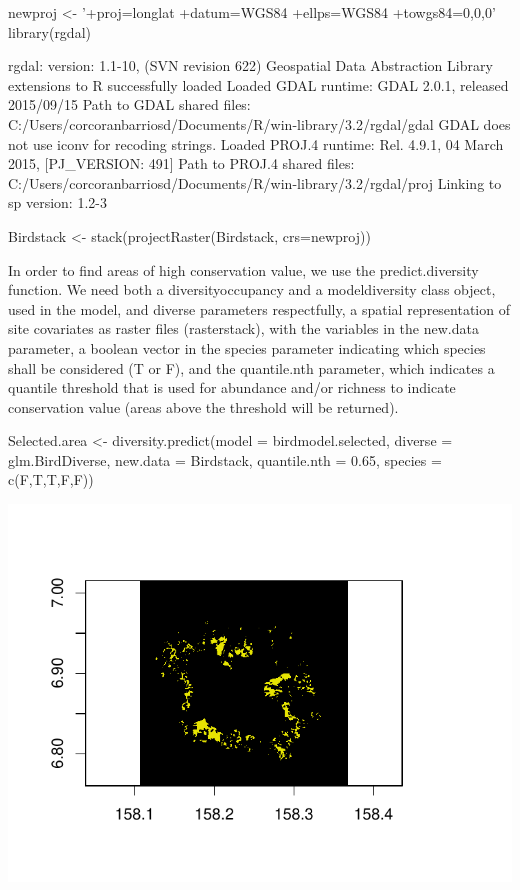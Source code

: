 \documentclass[article]{jss}
\begin{document}
\begin{CodeChunk}
\begin{CodeInput}
newproj <- '+proj=longlat +datum=WGS84 +ellps=WGS84 +towgs84=0,0,0'
library(rgdal)
\end{CodeInput}
\begin{CodeOutput}
rgdal: version: 1.1-10, (SVN revision 622)
 Geospatial Data Abstraction Library extensions to R successfully loaded
 Loaded GDAL runtime: GDAL 2.0.1, released 2015/09/15
 Path to GDAL shared files: C:/Users/corcoranbarriosd/Documents/R/win-library/3.2/rgdal/gdal
 GDAL does not use iconv for recoding strings.
 Loaded PROJ.4 runtime: Rel. 4.9.1, 04 March 2015, [PJ_VERSION: 491]
 Path to PROJ.4 shared files: C:/Users/corcoranbarriosd/Documents/R/win-library/3.2/rgdal/proj
 Linking to sp version: 1.2-3 
\end{CodeOutput}
\begin{CodeInput}
Birdstack <- stack(projectRaster(Birdstack, crs=newproj))
\end{CodeInput}
\end{CodeChunk}

In order to find areas of high conservation value, we use the
predict.diversity function. We need both a diversityoccupancy and a
modeldiversity class object, used in the model, and diverse parameters
respectfully, a spatial representation of site covariates as raster
files (rasterstack), with the variables in the new.data parameter, a
boolean vector in the species parameter indicating which species shall
be considered (T or F), and the quantile.nth parameter, which indicates
a quantile threshold that is used for abundance and/or richness to
indicate conservation value (areas above the threshold will be
returned).

\begin{CodeChunk}
\begin{CodeInput}
Selected.area <- diversity.predict(model = birdmodel.selected, diverse = glm.BirdDiverse, new.data = Birdstack, quantile.nth = 0.65, species =
c(F,T,T,F,F))
\end{CodeInput}


\begin{center}\includegraphics{diversityocc_files/figure-latex/unnamed-chunk-22-1} \end{center}

\end{CodeChunk}
\end{document}

